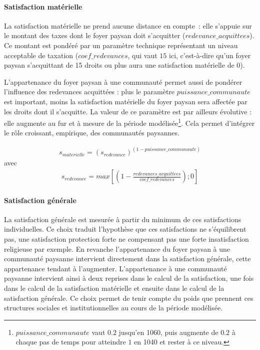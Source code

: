 \paragraph{Satisfaction matérielle}

La satisfaction matérielle ne prend aucune distance en compte : elle s'appuie sur le montant des taxes dont le foyer paysan doit s'acquitter ($redevance\_acquittees$).
Ce montant est pondéré par un paramètre technique représentant un niveau \og acceptable\fg{} de taxation ($coef\_redevances$, qui vaut $15$ ici, c'est-à-dire qu'un foyer paysan s'acquittant de 15 droits ou plus aura une satisfaction matérielle de 0).

L'appartenance du foyer paysan à une communauté permet aussi de pondérer l'influence des redevances acquittées : plus le paramètre $puissance\_communaute$ est important, moins la satisfaction matérielle du foyer paysan sera affectée par les droits dont il s'acquitte.
La valeur de ce paramètre est par ailleurs évolutive : elle augmente au fur et à mesure de la période modélisée\footnote{
$puissance\_communaute$ vaut $0.2$ jusqu'en 1060, puis augmente de $0.2$ à chaque pas de temps pour atteindre $1$ en 1040 et rester à ce niveau.
}.
Cela permet d'intégrer le rôle croissant, empirique, des communautés paysannes.


\begin{equation*}
\begin{gathered}
s_{materielle} = (s_{redevance})^{(1-puissance\_communaute)}
\end{gathered}
\end{equation*}
avec 
\begin{equation*}
\begin{gathered}
s_{redevance} = max \left[ \left( 1- \frac{redevances\_acquittees}{coef\_redevances} \right) ; 0 \right]
\end{gathered}
\end{equation*}

\paragraph{Satisfaction générale}

La satisfaction générale est mesurée à partir du minimum de ces satisfactions individuelles.
Ce choix traduit l'hypothèse que ces satisfactions ne s'équilibrent pas, une \og satisfaction protection\fg{} forte ne compensant pas une forte insatisfaction religieuse par exemple.
En revanche l'appartenance du foyer paysan à une communauté paysanne intervient directement dans la satisfaction générale, cette appartenance tendant à l'augmenter.
L'appartenance à une communauté paysanne intervient ainsi à deux reprises dans le calcul de la satisfaction, une fois dans le calcul de la satisfaction matérielle et ensuite dans le calcul de la satisfaction générale.
Ce choix permet de tenir compte du poids que prennent ces structures sociales et institutionnelles au cours de la période modélisée.


